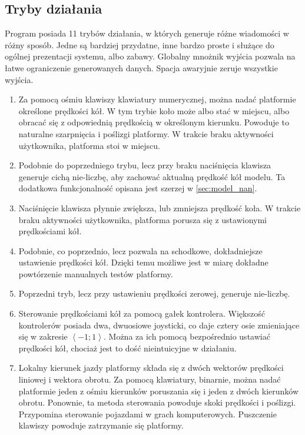 		\subsection{Tryby działania}
			Program posiada 11 trybów działania, w których generuje różne wiadomości w różny sposób.
			Jedne są bardziej przydatne, inne bardzo proste i służące do ogólnej prezentacji systemu, albo zabawy.
			Globalny mnożnik wyjścia pozwala na łatwe ograniczenie generowanych danych. Spacja awaryjnie zeruje wszystkie wyjścia.
			\begin{enumerate}
				\item Za pomocą ośmiu klawiszy klawiatury numerycznej, można nadać platformie określone prędkości kół.
				W tym trybie koło może albo stać w miejscu, albo obracać się z odpowiednią prędkością w określonym kierunku. 
				Powoduje to naturalne szarpnięcia i poślizgi platformy. W trakcie braku aktywności użytkownika, platforma stoi w miejscu.
				\item Podobnie do poprzedniego trybu, lecz przy braku naciśnięcia klawisza generuje cichą nie-liczbę, aby zachować aktualną prędkość kół modelu.
				Ta dodatkowa funkcjonalność opisana jest szerzej w \ref{sec:model_nan}.
				\item Naciśnięcie klawisza płynnie zwiększa, lub zmniejsza prędkość koła. W trakcie braku aktywności użytkownika, platforma porusza się 
				z ustawionymi prędkościami kół.
				\item Podobnie, co poprzednio, lecz pozwala na schodkowe, dokładniejsze ustawienie prędkości kół. 
				Dzięki temu możliwe jest w miarę dokładne powtórzenie manualnych testów platformy.
				\item Poprzedni tryb, lecz przy ustawieniu prędkości zerowej, generuje nie-liczbę.
				\item Sterowanie prędkościami kół za pomocą gałek kontrolera.
				Większość kontrolerów posiada dwa, dwuosiowe joysticki, co daje cztery osie zmieniające się w zakresie $\left<-1;1\right>$.
				Można za ich pomocą bezpośrednio ustawiać prędkości kół, chociaż jest to dość nieintuicyjne w działaniu.
				\item Lokalny kierunek jazdy platformy składa się z dwóch wektorów prędkości liniowej i wektora obrotu. 
				Za pomocą klawiatury, binarnie, można nadać platformie jeden z ośmiu kierunków poruszania się i jeden z dwóch kierunków obrotu.
				Ponownie, ta metoda sterowania powoduje skoki prędkości i poślizgi. Przypomina sterowanie pojazdami w grach komputerowych.
				Puszczenie klawiszy powoduje zatrzymanie się platformy.

\end{enumerate}
